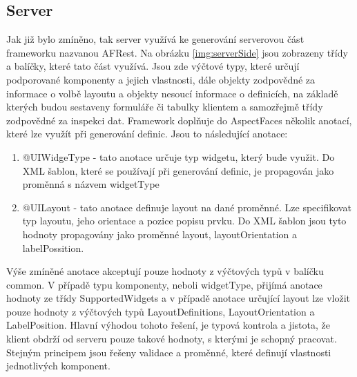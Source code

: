 \subsection{Server}
Jak již bylo zmíněno, tak server využívá ke generování serverovou část frameworku nazvanou AFRest. Na obrázku \ref{img:serverSide} jsou zobrazeny třídy a balíčky, které tato část využívá. Jsou zde výčtové typy, které určují podporované komponenty a jejich vlastnosti, dále objekty zodpovědné za informace o volbě layoutu a objekty nesoucí informace o definicích, na základě kterých budou sestaveny formuláře či tabulky klientem a samozřejmě třídy zodpovědné za inspekci dat. Framework doplňuje do AspectFaces několik anotací, které lze využít při generování definic. Jsou to následující anotace:
\begin{enumerate}
\item @UIWidgeType - tato anotace určuje typ widgetu, který bude využit. Do XML šablon, které se používají při generování definic, je propagován jako proměnná s názvem widgetType
\item @UILayout - tato anotace definuje layout na dané proměnné. Lze specifikovat typ layoutu, jeho orientace a pozice popisu prvku. Do XML šablon jsou tyto hodnoty propagovány jako proměnné layout, layoutOrientation a labelPossition. 
\end{enumerate}
Výše zmíněné anotace akceptují pouze hodnoty z výčtových typů v balíčku common. V případě typu komponenty, neboli widgetType, přijímá anotace hodnoty ze třídy SupportedWidgets a v případě anotace určující layout lze vložit pouze hodnoty z výčtových typů LayoutDefinitions, LayoutOrientation a LabelPosition. Hlavní výhodou tohoto řešení, je typová kontrola a jistota, že klient obdrží od serveru pouze takové hodnoty, s kterými je schopný pracovat. Stejným principem jsou řešeny validace a proměnné, které definují vlastnosti jednotlivých komponent. 

